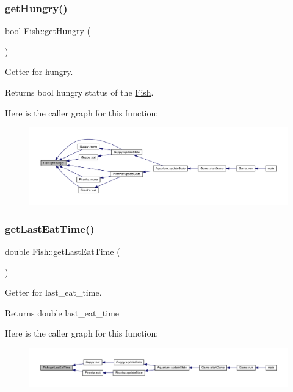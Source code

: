 \subsubsection{\texorpdfstring{get\+Hungry()}{getHungry()}}
{\footnotesize\ttfamily bool Fish\+::get\+Hungry (\begin{DoxyParamCaption}{ }\end{DoxyParamCaption})}



Getter for hungry. 

\begin{DoxyReturn}{Returns}
bool hungry status of the \mbox{\hyperlink{class_fish}{Fish}}. 
\end{DoxyReturn}
Here is the caller graph for this function\+:\nopagebreak
\begin{figure}[H]
\begin{center}
\leavevmode
\includegraphics[width=350pt]{class_fish_aa4f43ec5e63aff8a1db32d530a91652d_icgraph}
\end{center}
\end{figure}
\mbox{\label{class_fish_a5cc60f7e97c95136c19d54b4e49a5262}} 
\subsubsection{\texorpdfstring{get\+Last\+Eat\+Time()}{getLastEatTime()}}
{\footnotesize\ttfamily double Fish\+::get\+Last\+Eat\+Time (\begin{DoxyParamCaption}{ }\end{DoxyParamCaption})}



Getter for last\+\_\+eat\+\_\+time. 

\begin{DoxyReturn}{Returns}
double last\+\_\+eat\+\_\+time 
\end{DoxyReturn}
Here is the caller graph for this function\+:\nopagebreak
\begin{figure}[H]
\begin{center}
\leavevmode
\includegraphics[width=350pt]{class_fish_a5cc60f7e97c95136c19d54b4e49a5262_icgraph}
\end{center}
\end{figure}
\mbox{\label{class_fish_ab097bcfc0f0402bc1c9e048bf2351290}} 
